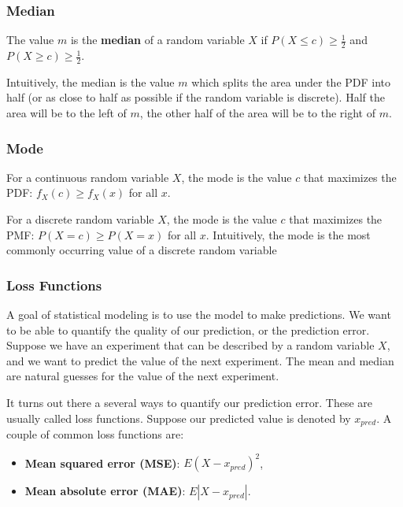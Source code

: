 \documentclass[
]{book}
\providecommand{\tightlist}{%
  \setlength{\itemsep}{0pt}\setlength{\parskip}{0pt}}
\begin{document}
\subsubsection{Median}\label{median-1}

The value \(m\) is the \textbf{median} of a random variable \(X\) if \(P(X \leq c) \geq \frac{1}{2}\) and \(P(X \geq c) \geq \frac{1}{2}\).

Intuitively, the median is the value \(m\) which splits the area under the PDF into half (or as close to half as possible if the random variable is discrete). Half the area will be to the left of \(m\), the other half of the area will be to the right of \(m\).

\subsubsection{Mode}\label{mode-1}

For a continuous random variable \(X\), the mode is the value \(c\) that maximizes the PDF: \(f_X(c) \geq f_X(x)\) for all \(x\).

For a discrete random variable \(X\), the mode is the value \(c\) that maximizes the PMF: \(P(X=c) \geq P(X=x)\) for all \(x\). Intuitively, the mode is the most commonly occurring value of a discrete random variable

\subsubsection{Loss Functions}\label{loss-functions}

A goal of statistical modeling is to use the model to make predictions. We want to be able to quantify the quality of our prediction, or the prediction error. Suppose we have an experiment that can be described by a random variable \(X\), and we want to predict the value of the next experiment. The mean and median are natural guesses for the value of the next experiment.

It turns out there a several ways to quantify our prediction error. These are usually called loss functions. Suppose our predicted value is denoted by \(x_{pred}\). A couple of common loss functions are:

\begin{itemize}
\tightlist
\item
  \textbf{Mean squared error (MSE)}: \(E(X-x_{pred})^2\),
\item
  \textbf{Mean absolute error (MAE)}: \(E|X-x_{pred}|\).
\end{itemize}
\end{document}

